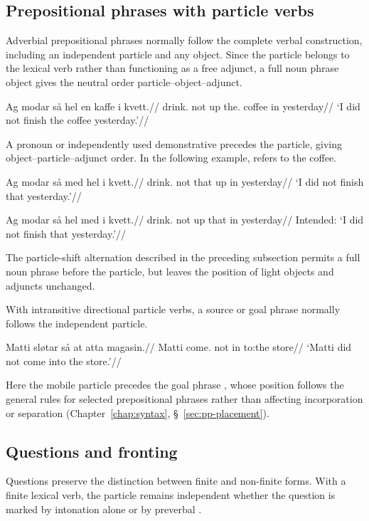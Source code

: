 \subsection{Prepositional phrases with particle verbs}
\label{sec:particle-pp-placement}

Adverbial prepositional phrases normally follow the complete verbal construction, including an independent particle and any object. Since the particle belongs to the lexical verb rather than functioning as a free adjunct, a full noun phrase object gives the neutral order particle--object--adjunct.

\pex
\begingl
\gla Ag modar så hel en kaffe i kvett.//
\glb \First{}\Sg{} drink.\Pst{} not up the.\M{} coffee in yesterday//
\glft `I did not finish the coffee yesterday.'//
\endgl
\xe

A pronoun or independently used demonstrative precedes the particle, giving object--particle--adjunct order. In the following example,  refers to the coffee.

\pex
\begingl
\gla Ag modar så med hel i kvett.//
\glb \First{}\Sg{} drink.\Pst{} not that up in yesterday//
\glft `I did not finish that yesterday.'//
\endgl
\xe

\pex
\begingl
\gla *Ag modar så hel med i kvett.//
\glb \First{}\Sg{} drink.\Pst{} not up that in yesterday//
\glft Intended: `I did not finish that yesterday.'//
\endgl
\xe

The particle-shift alternation described in the preceding subsection permits a full noun phrase before the particle, but leaves the position of light objects and adjuncts unchanged.

With intransitive directional particle verbs, a source or goal phrase normally follows the independent particle.

\pex
\begingl
\gla Matti sløtar så at atta magasin.//
\glb Matti come.\Pst{} not in to:the store//
\glft `Matti did not come into the store.'//
\endgl
\xe

Here the mobile particle  precedes the goal phrase , whose position follows the general rules for selected prepositional phrases rather than affecting incorporation or separation (Chapter~\ref{chap:syntax}, \S~\ref{sec:pp-placement}).

\subsection{Questions and fronting}

Questions preserve the distinction between finite and non-finite forms. With a finite lexical verb, the particle remains independent whether the question is marked by intonation alone or by preverbal .

